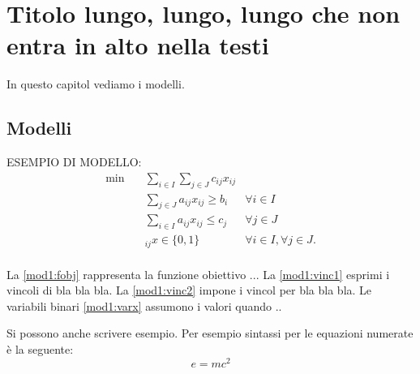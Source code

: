 \chapter[Titolo corso]{Titolo lungo, lungo, lungo che non entra in alto nella testi}\label{chap:lungo}
In questo capitol vediamo i modelli.

\section{Modelli}

ESEMPIO DI MODELLO:
\begin{align}
\label{mod1:fobj} \min \quad & \sum_{i \in I}\sum_{j \in J} c_{ij} x_{ij} \\
\label{mod1:vinc1}           & \sum_{j \in J} a_{ij} x_{ij} \geq b_i & \forall i \in I \\
\label{mod1:vinc2}           & \sum_{i \in I} a_{ij} x_{ij} \leq c_j & \forall j \in J \\
\label{mod1:varx}            &_{ij} x \in \{0,1\} & \forall i \in I, \forall j \in J. \\
\end{align}

La \eqref{mod1:fobj} rappresenta la funzione obiettivo ...
La \eqref{mod1:vinc1} esprimi i vincoli di bla bla bla.
La \eqref{mod1:vinc2} impone i vincol per bla bla bla.
Le variabili binari \eqref{mod1:varx} assumono i valori quando ..

\begin{esempio}\label{esempio:a}
Si possono anche scrivere esempio. Per esempio sintassi per le equazioni numerate è la seguente:
\begin{equation}\label{eq:einstein}
e = m c^2
\end{equation}
\end{esempio}